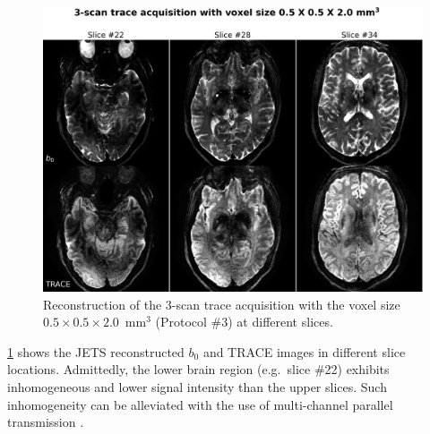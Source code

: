 \documentclass[preprint,12pt,authoryear,review]{elsarticle}
\begin{document}
    \begin{figure}
        \centering
        \includegraphics[width=\textwidth]{../figures/fig8.png}
        \caption{Reconstruction of the 3-scan trace acquisition with
        the voxel size $0.5\times0.5\times2.0$~mm$^3$ (Protocol \#3)
        at different slices.}
        \label{FIG:0.5mm_slice}
    \end{figure}

    \cref{FIG:0.5mm_slice} shows the JETS reconstructed $b_0$
    and TRACE images in different slice locations.
    Admittedly, the lower brain region (e.g.~slice \#22)
    exhibits inhomogeneous and lower signal intensity
    than the upper slices.
    Such inhomogeneity can be alleviated with
    the use of multi-channel parallel transmission
    \citep{katscher_2003_ptx,grissom_2010_ptx}.
\end{document}
